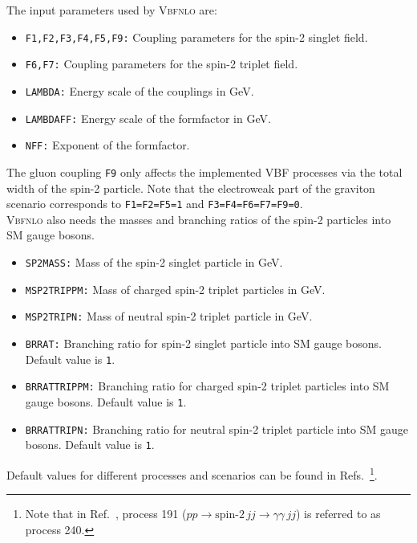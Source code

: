 \documentclass[english,12pt]{article}
\begin{document}
The input parameters used by \textsc{Vbfnlo} are:
\begin{itemize}
 \item {\tt F1,F2,F3,F4,F5,F9:} Coupling parameters for the spin-2 singlet field. 
 \item {\tt F6,F7:} Coupling parameters for the spin-2 triplet field. 
 \item {\tt LAMBDA:} Energy scale of the couplings in GeV. 
 \item {\tt LAMBDAFF:} Energy scale of the formfactor in GeV. 
 \item {\tt NFF:} Exponent of the formfactor. 
\end{itemize}
The gluon coupling {\tt F9} only affects the implemented VBF processes via the total 
width of the spin-2 particle. 
Note that the electroweak part of the graviton scenario corresponds 
to {\tt F1=F2=F5=1} and {\tt F3=F4=F6=F7=F9=0}. \\

\textsc{Vbfnlo} also needs the masses and branching ratios of the spin-2
particles into SM gauge bosons. 
\begin{itemize}
 \item {\tt SP2MASS:} Mass of the spin-2 singlet particle in GeV.  
 \item {\tt MSP2TRIPPM:} Mass of charged spin-2 triplet particles in GeV. 
 \item {\tt MSP2TRIPN:} Mass of neutral spin-2 triplet particle in GeV. 
 \item {\tt BRRAT:} Branching ratio for spin-2 singlet particle into SM gauge bosons. 
 Default value is {\tt 1}.
 \item {\tt BRRATTRIPPM:} Branching ratio for charged spin-2 triplet particles into SM gauge bosons.  
Default value is {\tt 1}.
 \item {\tt BRRATTRIPN:} Branching ratio for neutral spin-2 triplet particle into SM gauge bosons.  Default 
value is {\tt 1}.
\end{itemize}

Default values for different processes and scenarios can be found in 
Refs.~\cite{frank,Frank:2012wh,Frank:2013gca}\footnote{Note that in Ref.~\cite{frank}, 
process 191 ($pp \rightarrow \mbox{spin-2} \, jj \rightarrow \gamma \gamma \, jj$) is referred to as process 240.}.
\end{document}
